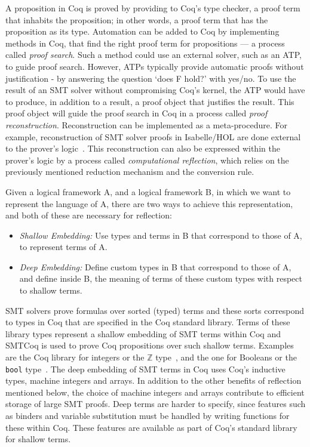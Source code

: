 \documentclass{article}
\begin{document}
	A proposition in Coq is proved by 
	providing to Coq's type checker, a 
	proof term that inhabits the 
	proposition; in other words, a 
	proof term that has the proposition 
	as its type. Automation can be 
	added to Coq by implementing 
	methods in Coq, that find the right 
	proof term for propositions --- a 
	process called \textit{proof search}. 
	Such a method could use an external 
	solver, such as an ATP, to guide 
	proof search. However, ATPs 
	typically provide automatic 
	proofs without justification - 
	by answering the question `does F 
	hold?' with	yes/no. To use the 
	result of an SMT solver without 
	compromising Coq's kernel, the ATP 
	would have to produce, in addition 
	to a result, a proof object
	that justifies the result. This 
	proof object will guide the proof search 
	in Coq in a process called 
	\textit{proof reconstruction}. 
	Reconstruction can be implemented 
	as a meta-procedure. For example, 
	reconstruction of SMT solver proofs 
	in Isabelle/HOL are done external to 
	the prover's logic~\cite{bohme}. 
	This reconstruction can also be 
	expressed within the prover's logic 
	by a process called 
	\textit{computational reflection}, 
	which relies on the previously 
	mentioned reduction mechanism and 
	the conversion rule.
	
	Given a logical framework A, and 
	a logical framework B, in which we 
	want to represent the language of A, 
	there are two ways to achieve this
	representation, and 
	both of these are necessary for 
	reflection:
	\begin{itemize}
		\item \textit{Shallow Embedding: }
		Use types and terms in B that 
		correspond to those of A, to 
		represent terms of A.
		\item\textit{Deep Embedding: }
		Define custom types in B that 
		correspond to those of A, and 
		define inside B, the meaning of 
		terms of these custom types with 
		respect to shallow terms.
	\end{itemize}

	SMT solvers prove formulas over 
	sorted (typed) terms and these 
	sorts correspond to types in 
	Coq that are specified in the 
	Coq standard library. Terms of 
	these library types represent a 
	shallow embedding of SMT 
	terms within Coq and SMTCoq is used 
	to prove Coq propositions over such 
	shallow terms. Examples are the 
	Coq library for integers or 
	the $\mathbb{Z}$ type~\cite{CoqZ},
	and the one for Booleans or the 
	\texttt{bool} type~\cite{CoqBool}.
	The deep embedding of SMT terms 
	in Coq uses Coq's inductive types,
	machine integers and arrays. In 
	addition to the other benefits 
	of reflection mentioned below,
	the choice of machine integers 
	and arrays contribute to 
	efficient storage of large 
	SMT proofs. Deep terms are harder 
	to specify, since features such as 
	binders 
	and variable substitution must be 
	handled by writing functions 
	for these within Coq. These 
	features are available as part 
	of Coq's standard library 
	for shallow terms. 
	
\end{document}

